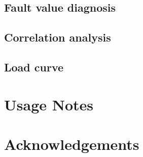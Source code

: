 \documentclass[12pt]{article}
\begin{document}
\subsection*{Fault value diagnosis}

\subsection*{Correlation analysis}
\subsection*{Load curve}

\section*{Usage Notes}

\section*{Acknowledgements}

\end{document}
